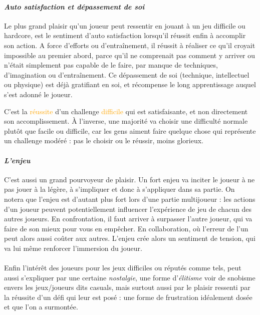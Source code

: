 			\paragraph{\emph{Auto satisfaction et dépassement de soi} \\ \quad}
Le plus grand plaisir qu’un joueur peut ressentir en jouant à un jeu difficile ou \gls{hardcore}, est le sentiment d’auto satisfaction lorsqu’il réussit enfin à accomplir son action. A force d’efforts ou d’entraînement, il réussit à réaliser ce qu’il croyait impossible au premier abord, parce qu’il ne comprenait pas comment y arriver ou n’était simplement pas capable de le faire, par manque de techniques, d’imagination ou d’entraînement. Ce dépassement de soi (technique, intellectuel ou physique) est déjà gratifiant en soi, et récompense le long apprentissage auquel s’est adonné le joueur.

C'est la \textcolor{orange}{réussite} d'un challenge \textcolor{orange}{difficile} qui est satisfaisante, et non directement son accomplissement. À l'inverse, une majorité va choisir une difficulté normale plutôt que facile ou difficile, car les gens aiment \textcolor{vert}{faire} quelque chose qui représente un \textcolor{vert}{challenge modéré} : pas le choisir ou le réussir, moins glorieux.

			\paragraph{\emph{L’enjeu} \\ \quad}
C’est aussi un grand pourvoyeur de plaisir. Un fort enjeu va inciter le joueur à ne pas jouer à la légère, à s’impliquer et donc à s’appliquer dans sa partie. On notera que l’enjeu est d’autant plus fort lors d'une partie multijoueur : les actions d’un joueur peuvent potentiellement influencer l’expérience de jeu de chacun des autres joueurs. En confrontation, il faut arriver à surpasser l’autre joueur, qui va faire de son mieux pour vous en empêcher. En collaboration, où l’erreur de l’un peut alors aussi coûter aux autres. L’enjeu crée alors un sentiment de tension, qui va lui même renforcer l’immersion du joueur.

\paragraph{}Enfin l’intérêt des joueurs pour les jeux difficiles ou réputés comme tels, peut aussi s’expliquer par une certaine \emph{nostalgie}, une forme d’\emph{élitisme} voir de snobisme envers les jeux/joueurs dits \glspl{casual}, mais surtout aussi par le plaisir ressenti par la réussite d’un défi qui leur est posé : une forme de frustration idéalement dosée et que l’on a surmontée.


